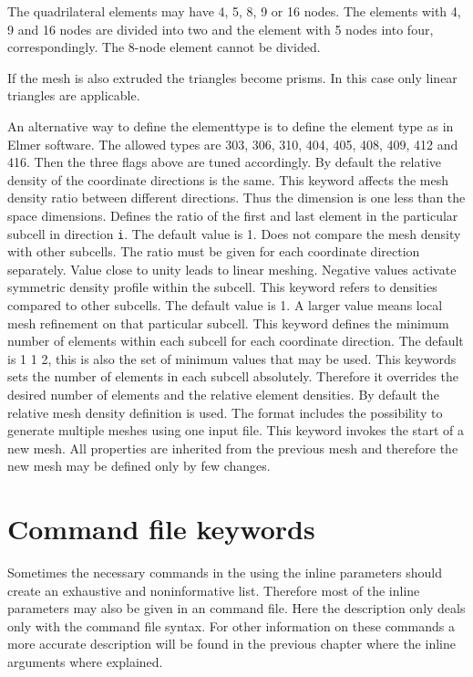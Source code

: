 The quadrilateral elements may have 4, 5, 8, 9 or 16 nodes. The 
elements with 4, 9  and 16 nodes are divided into two and the element with
5 nodes into four, correspondingly. The 8-node element cannot be divided.

If the mesh is also extruded the triangles become prisms. In this case
only linear triangles are applicable.


An alternative way to define the elementtype is to define the 
element type as in Elmer software.
The allowed types are 303, 306, 310, 404, 405, 408, 409,
412 and 416. Then the three flags above are tuned accordingly.
%
By default the relative density of the coordinate 
directions is the same. This keyword affects the 
mesh density ratio between different directions.
Thus the dimension is one less than the space dimensions.
%
Defines the ratio of the first and last element in the particular
subcell in direction \texttt{i}. The default value is 1.
Does not compare the mesh density with other subcells.
The ratio must be given for each coordinate direction 
separately. Value close to unity leads to linear meshing.
Negative values activate symmetric density profile within the subcell. 
%
This keyword refers 
to densities compared to other subcells.
The default value is 1. A larger value means local 
mesh refinement on that particular subcell.
%
This keyword defines the minimum number of elements 
within each subcell for each coordinate direction.
The default is 1 1 2, this is also the set of minimum values
that may be used.
%
This keywords sets the number of elements in each subcell
absolutely. Therefore it overrides the desired number of elements
and the relative element densities. By default the relative 
mesh density definition is used. 
%
The format includes the possibility to generate multiple
meshes using one input file. This keyword invokes the 
start of a new mesh. All properties are inherited from the 
previous mesh and therefore the new mesh may be 
defined only by few changes.
\sifend



\section{Command file keywords}

Sometimes the necessary commands in the using the inline parameters
should create an exhaustive and noninformative list. Therefore most of the
inline parameters may also be given in an command file.
Here the description only deals only with the command file
syntax. For other information on these commands a more accurate description will 
be found in the previous chapter where the inline arguments where explained.


